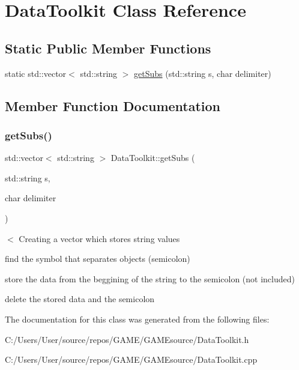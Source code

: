 \hypertarget{class_data_toolkit}{}\section{Data\+Toolkit Class Reference}
\label{class_data_toolkit}
\subsection*{Static Public Member Functions}
\begin{DoxyCompactItemize}
\item 
static std\+::vector$<$ std\+::string $>$ \mbox{\hyperlink{class_data_toolkit_aca86f00861be433066ed7d5f3962c387}{get\+Subs}} (std\+::string s, char delimiter)
\end{DoxyCompactItemize}


\subsection{Member Function Documentation}
\mbox{\label{class_data_toolkit_aca86f00861be433066ed7d5f3962c387}} 
\subsubsection{\texorpdfstring{get\+Subs()}{getSubs()}}
{\footnotesize\ttfamily std\+::vector$<$ std\+::string $>$ Data\+Toolkit\+::get\+Subs (\begin{DoxyParamCaption}\item[{std\+::string}]{s,  }\item[{char}]{delimiter }\end{DoxyParamCaption})\hspace{0.3cm}{\ttfamily [static]}}

$<$ Creating a vector which stores string values

find the symbol that separates objects (semicolon)

store the data from the beggining of the string to the semicolon (not included)

delete the stored data and the semicolon 

The documentation for this class was generated from the following files\+:\begin{DoxyCompactItemize}
\item 
C\+:/\+Users/\+User/source/repos/\+G\+A\+M\+E/\+G\+A\+M\+Esource/Data\+Toolkit.\+h\item 
C\+:/\+Users/\+User/source/repos/\+G\+A\+M\+E/\+G\+A\+M\+Esource/Data\+Toolkit.\+cpp\end{DoxyCompactItemize}
